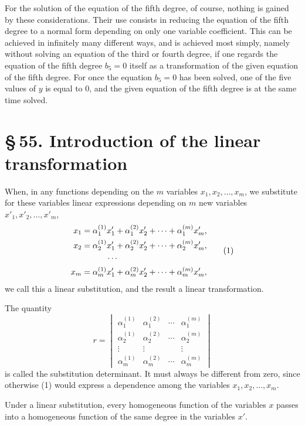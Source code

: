 \documentclass[11pt]{article}
\providecommand{\sect}[2]{\section*{\S\,#1. #2}}
\begin{document}
For the solution of the equation of the fifth degree, of course, nothing is gained by these considerations. Their use consists in reducing the equation of the fifth degree to a normal form depending on only one variable coefficient. This can be achieved in infinitely many different ways, and is achieved most simply, namely without solving an equation of the third or fourth degree, if one regards the equation of the fifth degree $b_5=0$ itself as a transformation of the given equation of the fifth degree. For once the equation $b_5=0$ has been solved, one of the five values of $y$ is equal to $0$, and the given equation of the fifth degree is at the same time solved.

\sect{55}{Introduction of the linear transformation}

When, in any functions depending on the $m$ variables $x_1,x_2,\ldots,x_m$, we substitute for these variables linear expressions depending on $m$ new variables $x'_1,x'_2,\ldots,x'_m$,
\begin{equation}
\begin{aligned}
 x_1&=\alpha_1^{(1)}x'_1+\alpha_1^{(2)}x'_2+\cdots+\alpha_1^{(m)}x'_m,\\
 x_2&=\alpha_2^{(1)}x'_1+\alpha_2^{(2)}x'_2+\cdots+\alpha_2^{(m)}x'_m,\\
 &\hspace{3.0em}\cdots\\
 x_m&=\alpha_m^{(1)}x'_1+\alpha_m^{(2)}x'_2+\cdots+\alpha_m^{(m)}x'_m,
\end{aligned}
\tag{1}
\end{equation}
we call this a linear substitution, and the result a linear transformation.

The quantity
\begin{equation}
 r=\begin{vmatrix}
 \alpha_1^{(1)}&\alpha_1^{(2)}&\cdots&\alpha_1^{(m)}\\
 \alpha_2^{(1)}&\alpha_2^{(2)}&\cdots&\alpha_2^{(m)}\\
 \vdots&\vdots&&\vdots\\
 \alpha_m^{(1)}&\alpha_m^{(2)}&\cdots&\alpha_m^{(m)}
 \end{vmatrix}
\tag{2}
\end{equation}
is called the substitution determinant. It must always be different from zero, since otherwise (1) would express a dependence among the variables $x_1,x_2,\ldots,x_m$.

Under a linear substitution, every homogeneous function of the variables $x$ passes into a homogeneous function of the same degree in the variables $x'$.
\end{document}
